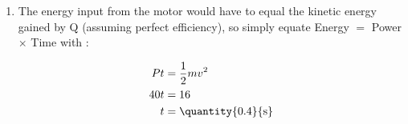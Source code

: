 \begin{problem}[AO1984PIQ1a]
{\begin{enumerate}
	\item The energy input from the motor would have to equal the kinetic energy gained by Q (assuming perfect efficiency), so simply equate Energy $=$ Power $\times$ Time with :

\begin{align*} 
Pt &= \frac{1}{2}mv^{2} \\
 40t &= 16 \\ 
 t&= \mbox{\quantity{0.4}{s}} 
 \end{align*}

\end{enumerate}
}
\end{problem}